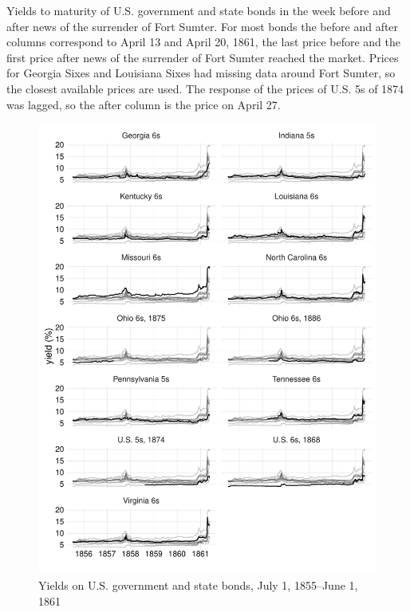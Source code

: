 \documentclass[]{article}\usepackage[]{graphicx}\usepackage[]{color}
\begin{document}
\begin{table}
  \centering
  

\caption[Yields to maturity of U.S. government and state bonds in the week before and after news of the surrender of Fort Sumter.]{
  Yields to maturity of U.S. government and state bonds in the week before and after news of the surrender of Fort Sumter.
  For most bonds the before and after columns correspond to April 13 and April 20, 1861, the last price before and the first price after news of the surrender of Fort Sumter reached the market.
  Prices for Georgia Sixes and Louisiana Sixes had missing data around Fort Sumter, so the closest available prices are used.
  The response of the prices of U.S. 5s of 1874 was lagged, so the after column is the price on April 27.}
\label{tab:sumter}

\end{table}

\begin{figure}
  \centering
  \includegraphics[width=\textwidth]{./figures/fig_yields_all-1}
\caption{Yields on U.S. government and state bonds, July  1, 1855--June  1, 1861}
\label{fig:yields_all}
\end{figure}
\end{document}
